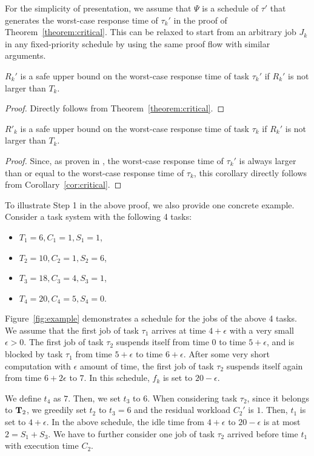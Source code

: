 For the simplicity of presentation, we assume that $\Psi$ is a schedule of $\tau'$ that generates the worst-case response time of $\tau_k'$ in the proof of Theorem~\ref{theorem:critical}. This can be relaxed to start from an arbitrary job $J_k$ in any fixed-priority schedule by using the same proof flow with similar arguments.

\begin{Corollary}
\label{cor:critical}
 $R_k'$ is a safe upper bound on the worst-case response time of task $\tau_k'$ if $R_k'$ is not larger than $T_k$.
\end{Corollary}
\begin{proof}
Directly follows from Theorem~\ref{theorem:critical}.
\end{proof}



\begin{Corollary}
$R'_k$ is a safe upper bound on the worst-case response time of task $\tau_k$ if $R_k'$ is not larger than $T_k$. 
\end{Corollary}
\begin{proof}
Since, as proven in \cite{Rajkumar_1990,Liu_2014}, the worst-case response time of $\tau_k'$ is always larger than or equal to the worst-case response time of $\tau_k$, this corollary directly follows from Corollary~\ref{cor:critical}. 
\end{proof}


  
To illustrate Step 1 in the above proof, we also provide one concrete example. Consider a task system with the following 4 tasks:
\begin{itemize}
\item $T_1 = 6, C_1 = 1, S_1 = 1$,
\item $T_2 = 10, C_2 = 1, S_2 = 6$,
\item $T_3 = 18, C_3 = 4, S_3 = 1$,
\item $T_4 = 20, C_4 = 5, S_4 = 0$.
\end{itemize}

Figure~\ref{fig:example} demonstrates a schedule for the jobs of the
above 4 tasks. We assume that the first job of task $\tau_1$ arrives
at time $4+\epsilon$ with a very small $\epsilon > 0$. The first job
of task $\tau_2$ suspends itself from time $0$ to time $5+\epsilon$,
and is blocked by task $\tau_1$ from time $5+\epsilon$ to time
$6+\epsilon$. After some very short computation with $\epsilon$ amount
of time, the first job of task $\tau_2$ suspends itself again from
time $6+2\epsilon$ to $7$.   In this schedule, $f_k$ is set to $20-\epsilon$.

We define $t_4$ as $7$. Then, we set $t_3$ to $6$. When considering
task $\tau_2$, since it belongs to ${\bf T}_2$, we greedily set $t_2$
to $t_3=6$ and the residual workload $C_2'$ is $1$. Then, $t_1$ is set
to $4+\epsilon$. In the above schedule, the idle time from
$4+\epsilon$ to $20-\epsilon$ is at most $2 = S_1+S_3$. We have to
further consider one job of task $\tau_2$ arrived before time $t_1$
with execution time $C_2$.
  
  
  

